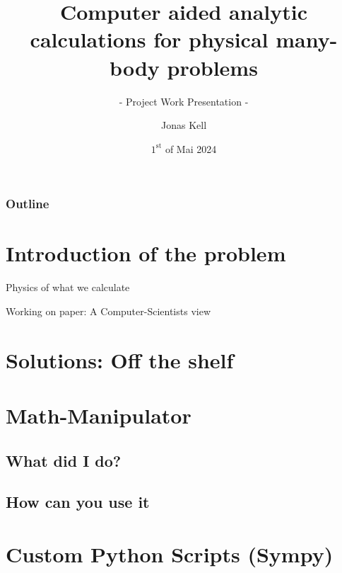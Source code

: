 \documentclass[aspectratio=169,handout]{beamer} %
\title[Computer aided calculations]{\vspace{-2em}Computer aided analytic calculations for physical many-body problems}
\subtitle{ - Project Work Presentation - }
\author{Jonas Kell}
\institute[TP III]{Chair for theoretical Physics III}
\date[01.05.2024]{$1^{\text{st}}$ of Mai 2024} %
\begin{document}
    \begin{frame}[t,plain] 
        \maketitle
    \end{frame}

    \begin{frame}
        \frametitle{Outline}
        \tableofcontents
    \end{frame}

    \section{Introduction of the problem}
    
    \begin{frame}{Physics of what we calculate}
    \end{frame}

    \begin{frame}{Working on paper: A Computer-Scientists view}
    \end{frame}

    \section{Solutions: Off the shelf}

    \section{Math-Manipulator}

    \subsection{What did I do?}
    \subsection{How can you use it}

    \section{Custom Python Scripts (Sympy)}
\end{document}
